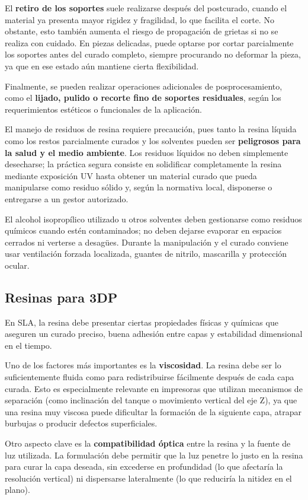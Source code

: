 El \textbf{retiro de los soportes} suele realizarse después del postcurado, cuando el material ya presenta mayor rigidez y fragilidad, lo que facilita el corte. No obstante, esto también aumenta el riesgo de propagación de grietas si no se realiza con cuidado. En piezas delicadas, puede optarse por cortar parcialmente los soportes antes del curado completo, siempre procurando no deformar la pieza, ya que en ese estado aún mantiene cierta flexibilidad.

Finalmente, se pueden realizar operaciones adicionales de posprocesamiento, como el \textbf{lijado, pulido o recorte fino de soportes residuales}, según los requerimientos estéticos o funcionales de la aplicación.

El manejo de residuos de resina requiere precaución, pues tanto la resina líquida como los restos parcialmente curados y los solventes pueden ser \textbf{peligrosos para la salud y el medio ambiente}. Los residuos líquidos no deben simplemente desecharse; la práctica segura consiste en solidificar completamente la resina mediante exposición UV hasta obtener un material curado que pueda manipularse como residuo sólido y, según la normativa local, disponerse o entregarse a un gestor autorizado.

El alcohol isopropílico utilizado u otros solventes deben gestionarse como residuos químicos cuando estén contaminados; no deben dejarse evaporar en espacios cerrados ni verterse a desagües. Durante la manipulación y el curado conviene usar ventilación forzada localizada, guantes de nitrilo, mascarilla y protección ocular.

\subsection{Resinas para 3DP}

En SLA, la resina debe presentar ciertas propiedades físicas y químicas que aseguren un curado preciso, buena adhesión entre capas y estabilidad dimensional en el tiempo.

Uno de los factores más importantes es la \textbf{viscosidad}. La resina debe ser lo suficientemente fluida como para redistribuirse fácilmente después de cada capa curada. Esto es especialmente relevante en impresoras que utilizan mecanismos de separación (como inclinación del tanque o movimiento vertical del eje Z), ya que una resina muy viscosa puede dificultar la formación de la siguiente capa, atrapar burbujas o producir defectos superficiales.

Otro aspecto clave es la \textbf{compatibilidad óptica} entre la resina y la fuente de luz utilizada. La formulación debe permitir que la luz penetre lo justo en la resina para curar la capa deseada, sin excederse en profundidad (lo que afectaría la resolución vertical) ni dispersarse lateralmente (lo que reduciría la nitidez en el plano). 

